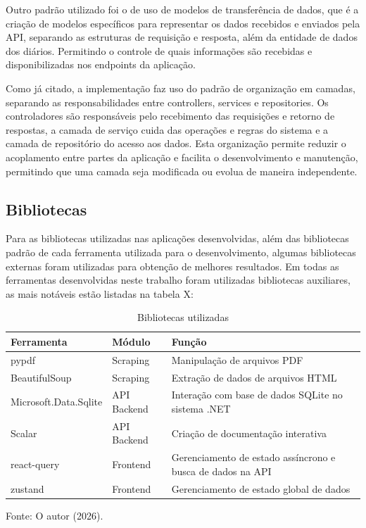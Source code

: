 Outro padrão utilizado foi o de uso de modelos de transferência de dados, que é a criação de modelos específicos para representar os dados recebidos e enviados pela API, separando as estruturas de requisição e resposta, além da entidade de dados dos diários. Permitindo o controle de quais informações são recebidas e disponibilizadas nos endpoints da aplicação.

Como já citado, a implementação faz uso do padrão de organização em camadas, separando as responsabilidades entre controllers, services e repositories. Os controladores são responsáveis pelo recebimento das requisições e retorno de respostas, a camada de serviço cuida das operações e regras do sistema e a camada de repositório do acesso aos dados. Esta organização permite reduzir o acoplamento entre partes da aplicação e facilita o desenvolvimento e manutenção, permitindo que uma camada seja modificada ou evolua de maneira independente.


\subsection{Bibliotecas}

Para as bibliotecas utilizadas nas aplicações desenvolvidas, além das bibliotecas padrão de cada ferramenta utilizada para o desenvolvimento, algumas bibliotecas externas foram utilizadas para obtenção de melhores resultados.
Em todas as ferramentas desenvolvidas neste trabalho foram utilizadas bibliotecas auxiliares, as mais notáveis estão listadas na tabela X: 

\begin{table}[h]
    \centering
    \caption{Bibliotecas utilizadas}
    \label{tab:tabela_bibliotecas_utilizadas}
    \begin{tabularx}{\textwidth}{l l X}
        \toprule
        Ferramenta & Módulo & Função \\
        \midrule
        pypdf & Scraping &  Manipulação de arquivos PDF \\ 
        BeautifulSoup & Scraping &  Extração de dados de arquivos HTML \\ 
        Microsoft.Data.Sqlite & API Backend &  Interação com base de dados SQLite no sistema .NET \\
        Scalar & API Backend &  Criação de documentação interativa \\ 
        react-query & Frontend & Gerenciamento de estado assíncrono e busca de dados na API \\
        zustand & Frontend &   Gerenciamento de estado global de dados \\
        \bottomrule
    \end{tabularx}
\end{table}{\footnotesize Fonte: O autor (2026).}


